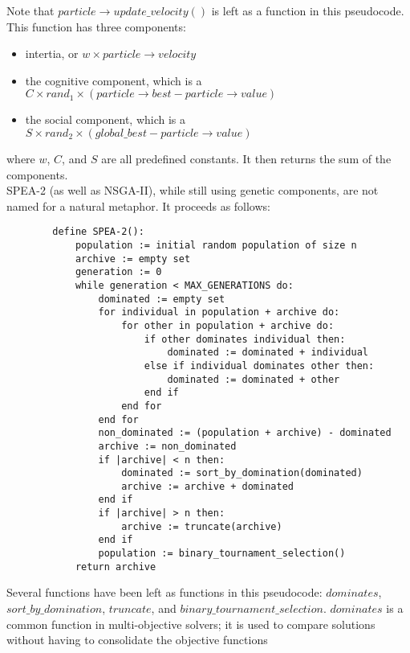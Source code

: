 \documentclass{article}
\begin{document}
    Note that \(particle \rightarrow update\_velocity()\) is left as a function in this pseudocode. This function has three components:
    \begin{itemize}
        \item intertia, or \(w \times particle \rightarrow velocity\)
        \item the cognitive component, which is a \(C \times rand_1 \times (particle \rightarrow best - particle \rightarrow value)\)
        \item the social component, which is a \(S \times rand_2 \times (global\_best - particle \rightarrow value)\)
    \end{itemize}
    where \(w\), \(C\), and \(S\) are all predefined constants. It then returns the sum of the components. \cite{EberhartKennedy} \cite{KhanesarTavakoliTeshnehlabShoorehdeli} \\
    SPEA-2 (as well as NSGA-II), while still using genetic components, are not named for a natural metaphor. It proceeds as follows:
    \begin{lstlisting}
        define SPEA-2():
            population := initial random population of size n
            archive := empty set
            generation := 0
            while generation < MAX_GENERATIONS do:
                dominated := empty set
                for individual in population + archive do:
                    for other in population + archive do:
                        if other dominates individual then:
                            dominated := dominated + individual
                        else if individual dominates other then:
                            dominated := dominated + other
                        end if
                    end for
                end for
                non_dominated := (population + archive) - dominated
                archive := non_dominated
                if |archive| < n then:
                    dominated := sort_by_domination(dominated)
                    archive := archive + dominated
                end if
                if |archive| > n then:
                    archive := truncate(archive)
                end if
                population := binary_tournament_selection()
            return archive
    \end{lstlisting}
    Several functions have been left as functions in this pseudocode: \(dominates\), \(sort\_by\_domination\), \(truncate\), and \(binary\_tournament\_selection\). 
    \(dominates\) is a common function in multi-objective solvers; it is used to compare solutions without having to consolidate the objective functions
\end{document}
